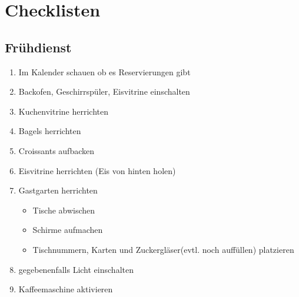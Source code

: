 \documentclass[12pt]{article}
\begin{document}
\clearpage
\section{Checklisten}

\subsection{Frühdienst}
\begin{enumerate}
    \item Im Kalender schauen ob es Reservierungen gibt
    \item Backofen, Geschirrspüler, Eisvitrine einschalten
    \item Kuchenvitrine herrichten
    \item Bagels herrichten
    \item Croissants aufbacken
    \item Eisvitrine herrichten (Eis von hinten holen)
    \item Gastgarten herrichten
    \begin{itemize}
        \item Tische abwischen
        \item Schirme aufmachen
        \item Tischnummern, Karten und Zuckergläser(evtl. noch auffüllen) platzieren
    \end{itemize}
    \item gegebenenfalls Licht einschalten
    \item Kaffeemaschine aktivieren
\end{enumerate}
\end{document}

